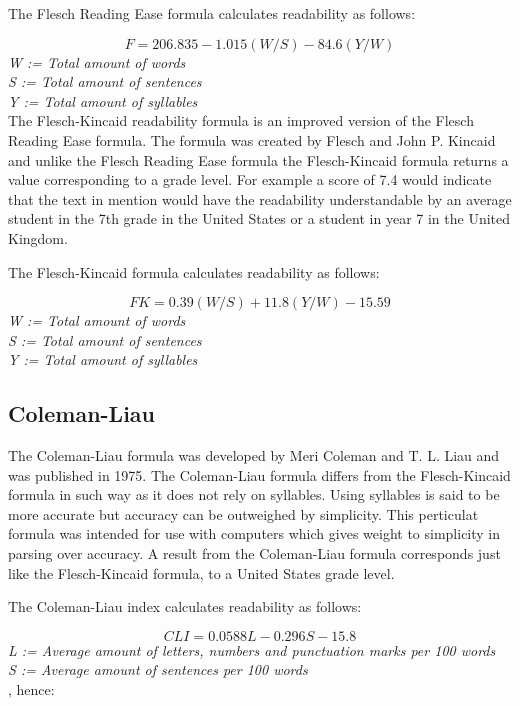 \documentclass[a4paper]{article}
\begin{document}
The Flesch Reading Ease formula calculates readability as follows:

\begin{equation}
F = 206.835 - 1.015(W/S) - 84.6(Y/W)
\end{equation}
\emph{W := Total amount of words}\\
\emph{S := Total amount of sentences}\\
\emph{Y := Total amount of syllables}\\

The Flesch-Kincaid readability formula is an improved version of the Flesch Reading Ease formula. The formula was created by Flesch and John P. Kincaid and unlike the Flesch Reading Ease formula the Flesch-Kincaid formula returns a value corresponding to a grade level\cite{navy75}. For example a score of 7.4 would indicate that the text in mention would have the readability understandable by an average student in the 7th grade in the United States or a student in year 7 in the United Kingdom. 

The Flesch-Kincaid formula calculates readability as follows:

\begin{equation}
FK = 0.39(W/S) + 11.8(Y/W) - 15.59
\end{equation}
\emph{W := Total amount of words}\\
\emph{S := Total amount of sentences}\\
\emph{Y := Total amount of syllables}\\

\subsection{Coleman-Liau}

The Coleman-Liau formula was developed by Meri Coleman and T. L. Liau and was published in 1975. The Coleman-Liau formula differs from the Flesch-Kincaid formula in such way as it does not rely on syllables\cite{coleman75}. Using syllables is said to be more accurate but accuracy can be outweighed by simplicity. This perticulat formula was intended for use with computers which gives weight to simplicity in parsing over accuracy\cite{coleman75}. A result from the Coleman-Liau formula corresponds just like the Flesch-Kincaid formula, to a United States grade level\cite{coleman75}. 

The Coleman-Liau index calculates readability as follows:

\begin{equation}
CLI = 0.0588L - 0.296S - 15.8
\end{equation}
\emph{L := Average amount of letters, numbers and punctuation marks per 100 words}\\
\emph{S := Average amount of sentences per 100 words}\\
\newline
, hence:
\end{document}
